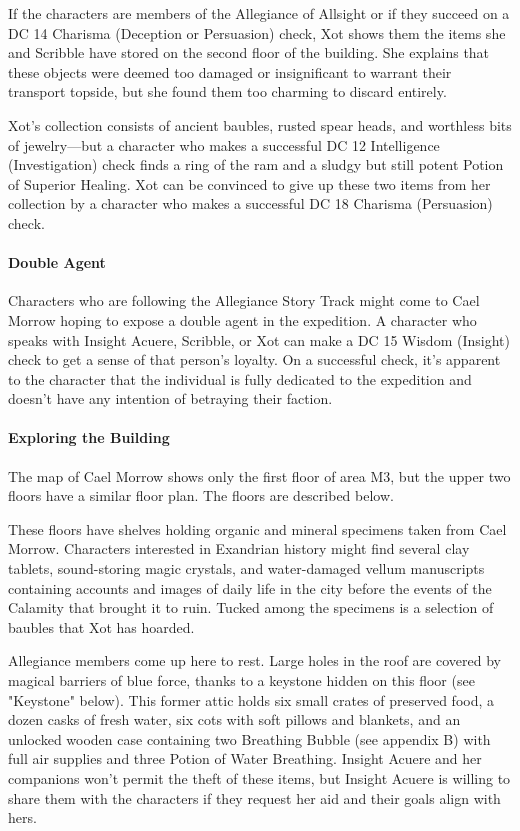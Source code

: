 \documentclass[10pt,a4paper,twoside,bg=print,twocolumn,openany,nodeprecatedcode]{dndbook}
\begin{document}
If the characters are members of the Allegiance of Allsight or if they succeed on a DC 14 Charisma (Deception or Persuasion) check, Xot shows them the items she and Scribble have stored on the second floor of the building. She explains that these objects were deemed too damaged or insignificant to warrant their transport topside, but she found them too charming to discard entirely.

Xot's collection consists of ancient baubles, rusted spear heads, and worthless bits of jewelry—but a character who makes a successful DC 12 Intelligence (Investigation) check finds a ring of the ram and a sludgy but still potent Potion of Superior Healing. Xot can be convinced to give up these two items from her collection by a character who makes a successful DC 18 Charisma (Persuasion) check.

\paragraph{Double Agent}
Characters who are following the Allegiance Story Track might come to Cael Morrow hoping to expose a double agent in the expedition. A character who speaks with Insight Acuere, Scribble, or Xot can make a DC 15 Wisdom (Insight) check to get a sense of that person's loyalty. On a successful check, it's apparent to the character that the individual is fully dedicated to the expedition and doesn't have any intention of betraying their faction.

\paragraph{Exploring the Building}
The map of Cael Morrow shows only the first floor of area M3, but the upper two floors have a similar floor plan. The floors are described below.


\begin{description}[nolistsep]
\item[First and Second Floors.]
These floors have shelves holding organic and mineral specimens taken from Cael Morrow. Characters interested in Exandrian history might find several clay tablets, sound-storing magic crystals, and water-damaged vellum manuscripts containing accounts and images of daily life in the city before the events of the Calamity that brought it to ruin. Tucked among the specimens is a selection of baubles that Xot has hoarded.
\item[Third Floor.]
Allegiance members come up here to rest. Large holes in the roof are covered by magical barriers of blue force, thanks to a keystone hidden on this floor (see "Keystone" below). This former attic holds six small crates of preserved food, a dozen casks of fresh water, six cots with soft pillows and blankets, and an unlocked wooden case containing two Breathing Bubble (see appendix B) with full air supplies and three Potion of Water Breathing. Insight Acuere and her companions won't permit the theft of these items, but Insight Acuere is willing to share them with the characters if they request her aid and their goals align with hers.
\end{description}
\end{document}
